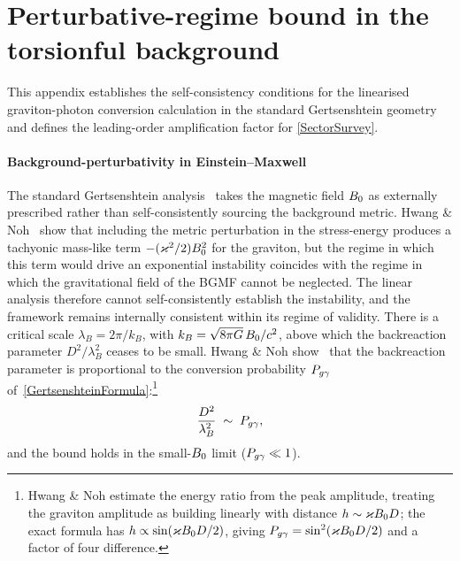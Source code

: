
\section{Perturbative-regime bound in the torsionful background}
\label{PerturbativeRegime}

This appendix establishes the self-consistency conditions
for the linearised graviton-photon conversion calculation in the
standard Gertsenshtein geometry and defines the
leading-order amplification factor for
\cref{SectorSurvey}.

\paragraph*{Background-perturbativity in Einstein--Maxwell}

The standard Gertsenshtein
analysis~\cite{gertsenshtein1962wave,boccaletti1970conversion,raffelt1988mixing}
takes the magnetic field $B_0$ as
externally prescribed rather than self-consistently sourcing the
background metric.
Hwang \& Noh~\cite{hwangnoh2023graviton} show that
including the metric perturbation in the stress-energy
produces a tachyonic mass-like term $-(\varkappa^2/2)B_0^2$ for
the graviton, but the regime in which this
term would drive an exponential instability coincides with the
regime in which the gravitational field of the BGMF cannot be neglected.
The linear analysis therefore cannot self-consistently establish
the instability, and the framework remains internally consistent
within its regime of validity.
There is a critical scale $\lambda_B = 2\pi/k_B$, with
$k_B = \sqrt{8\pi G}\,B_0/c^2$, above which the
backreaction parameter $D^2/\lambda_B^2$ ceases to be small.
Hwang \& Noh show~\cite{hwangnoh2023graviton} that the backreaction parameter is proportional to
the conversion probability $P_{g\gamma}$ of~\cref{GertsenshteinFormula}:\footnote{Hwang \& Noh estimate the energy ratio from the peak amplitude,
treating the graviton amplitude as building linearly with distance
$h\sim\varkappa B_0 D$; the exact formula has $h\propto\sin(\varkappa B_0 D/2)$,
giving $P_{g\gamma} = \sin^2(\varkappa B_0 D/2)$ and a factor of four difference.}
\begin{align}
  \frac{D^2}{\lambda_B^2}
  \;\sim\; P_{g\gamma},
  \label{HwangNohBound}
\end{align}
and the bound holds in the small-$B_0$ limit ($P_{g\gamma} \ll 1$).


